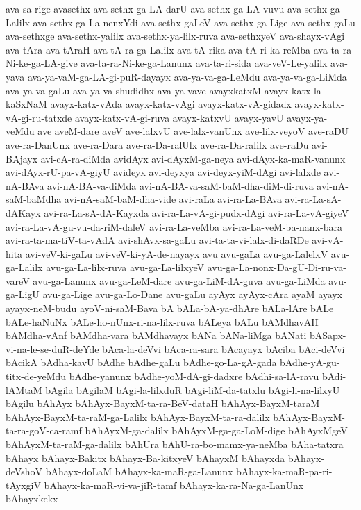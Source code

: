 {ava-sa-rige
avasethx
ava-sethx-ga-LA-darU
ava-sethx-ga-LA-vuvu
ava-sethx-ga-Lalilx
ava-sethx-ga-La-nenxYdi
ava-sethx-gaLeV
ava-sethx-ga-Lige
ava-sethx-gaLu
ava-sethxge
ava-sethx-yalilx
ava-sethx-ya-lilx-ruva
ava-sethxyeV
ava-shayx-vAgi
ava-tAra
ava-tAraH
ava-tA-ra-ga-Lalilx
ava-tA-rika
ava-tA-ri-ka-reMba
ava-ta-ra-Ni-ke-ga-LA-give
ava-ta-ra-Ni-ke-ga-Lanunx
ava-ta-ri-sida
ava-veV-Le-yalilx
ava-yava
ava-ya-vaM-ga-LA-gi-puR-dayayx
ava-ya-va-ga-LeMdu
ava-ya-va-ga-LiMda
ava-ya-va-gaLu
ava-ya-va-shudidhx
ava-ya-vave
avayxkatxM
avayx-katx-la-kaSxNaM
avayx-katx-vAda
avayx-katx-vAgi
avayx-katx-vA-gidadx
avayx-katx-vA-gi-ru-tatxde
avayx-katx-vA-gi-ruva
avayx-katxvU
avayx-yavU
avayx-ya-veMdu
ave
aveM-dare
aveV
ave-lalxvU
ave-lalx-vanUnx
ave-lilx-veyoV
ave-raDU
ave-ra-DanUnx
ave-ra-Dara
ave-ra-Da-ralUlx
ave-ra-Da-ralilx
ave-raDu
avi-BAjayx
avi-cA-ra-diMda
avidAyx
avi-dAyxM-ga-neya
avi-dAyx-ka-maR-vanunx
avi-dAyx-rU-pa-vA-giyU
avideyx
avi-deyxya
avi-deyx-yiM-dAgi
avi-lalxde
avi-nA-BAva
avi-nA-BA-va-diMda
avi-nA-BA-va-saM-baM-dha-diM-di-ruva
avi-nA-saM-baMdha
avi-nA-saM-baM-dha-vide
avi-raLa
avi-ra-La-BAva
avi-ra-La-sA-dAKayx
avi-ra-La-sA-dA-Kayxda
avi-ra-La-vA-gi-pudx-dAgi
avi-ra-La-vA-giyeV
avi-ra-La-vA-gu-vu-da-riM-daleV
avi-ra-La-veMba
avi-ra-La-veM-ba-nanx-bara
avi-ra-ta-ma-tiV-ta-vAdA
avi-shAvx-sa-gaLu
avi-ta-ta-vi-lalx-di-daRDe
avi-vA-hita
avi-veV-ki-gaLu
avi-veV-ki-yA-de-nayayx
avu
avu-gaLa
avu-ga-LalelxV
avu-ga-Lalilx
avu-ga-La-lilx-ruva
avu-ga-La-lilxyeV
avu-ga-La-nonx-Da-gU-Di-ru-va-vareV
avu-ga-Lanunx
avu-ga-LeM-dare
avu-ga-LiM-dA-guva
avu-ga-LiMda
avu-ga-LigU
avu-ga-Lige
avu-ga-Lo-Dane
avu-gaLu
ayAyx
ayAyx-cAra
ayaM
ayayx
ayayx-neM-budu
ayoV-ni-saM-Bava
bA
bALa-bA-ya-dhAre
bALa-lAre
bALe
bALe-haNuNx
bALe-ho-nUnx-ri-na-lilx-ruva
bALeya
bALu
bAMdhavAH
bAMdha-vAnf
bAMdha-vara
bAMdhavayx
bANa
bANa-liMga
bANati
bASapx-vi-na-le-se-duR-deYde
bAca-la-deVvi
bAca-ra-sara
bAcayayx
bAciba
bAci-deVvi
bAcikA
bAdha-kavU
bAdhe
bAdhe-gaLu
bAdhe-go-La-gA-gada
bAdhe-yA-gu-titx-de-yeMdu
bAdhe-yanunx
bAdhe-yoM-dA-gi-dadxre
bAdhi-sa-lA-ravu
bAdi-lAMtaM
bAgila
bAgilaM
bAgi-la-lilxduR
bAgi-liM-da-tatxlu
bAgi-li-na-lilxyU
bAgilu
bAhAyx
bAhAyx-BayxM-ta-ra-BeV-dataH
bAhAyx-BayxM-taraM
bAhAyx-BayxM-ta-raM-ga-Lalilx
bAhAyx-BayxM-ta-ra-dalilx
bAhAyx-BayxM-ta-ra-goV-ca-ramf
bAhAyxM-ga-dalilx
bAhAyxM-ga-ga-LoM-dige
bAhAyxMgeV
bAhAyxM-ta-raM-ga-dalilx
bAhUra
bAhU-ra-bo-mamx-ya-neMba
bAha-tatxra
bAhayx
bAhayx-Bakitx
bAhayx-Ba-kitxyeV
bAhayxM
bAhayxda
bAhayx-deVshoV
bAhayx-doLaM
bAhayx-ka-maR-ga-Lanunx
bAhayx-ka-maR-pa-ri-tAyxgiV
bAhayx-ka-maR-vi-va-jiR-tamf
bAhayx-ka-ra-Na-ga-LanUnx
bAhayxkekx
}
